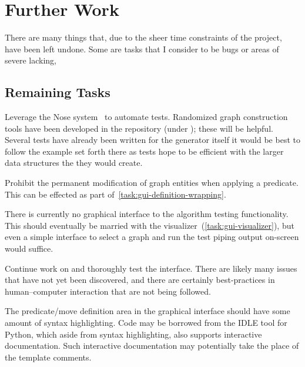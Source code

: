 \section{Further Work}
\label{sec:further-work}

There are many things that, due to the sheer time constraints of the project,
  have been left undone.
Some are tasks that I consider to be bugs or areas of severe lacking,

\subsection{Remaining Tasks}
\label{sec:tasks:bugs}

\begin{task}
  \label{task:test}
  Leverage the Nose system~\autocite{nose} to automate tests.
  Randomized graph construction tools have been developed in the repository
    (under );
  these will be helpful.
  Several tests have already been written for the generator itself \Dash
    it would be best to follow the example set forth there as tests hope to be
    efficient with the larger data structures the they would create.
\end{task}

\begin{task}
  \label{task:valid-pred}
  Prohibit the permanent modification of graph entities when applying a predicate.
  This can be effected as part of~\autoref{task:gui-definition-wrapping}.
\end{task}

\begin{task}
  \label{task:testing-interface}
  There is currently no graphical interface to the algorithm testing functionality.
  This should eventually be married with the visualizer~(\autoref{task:gui-visualizer}),
    but even a simple interface to select a graph and run the test \Dash
    piping output on-screen \Dash would suffice.
\end{task}

\begin{task}
  \label{task:interface}
  Continue work on and thoroughly test the interface.
  There are likely many issues that have not yet been discovered,
    and there are certainly best-practices in human--computer interaction
    that are not being followed.
\end{task}

\begin{task}
  \label{task:gui-syntax-highlighting}
  The predicate\slash move definition area in the graphical interface
    should have some amount of syntax highlighting.
  Code may be borrowed from the IDLE tool for Python,
    which aside from syntax highlighting, also supports interactive documentation.
  Such interactive documentation may potentially take the place of the template comments.
\end{task}

